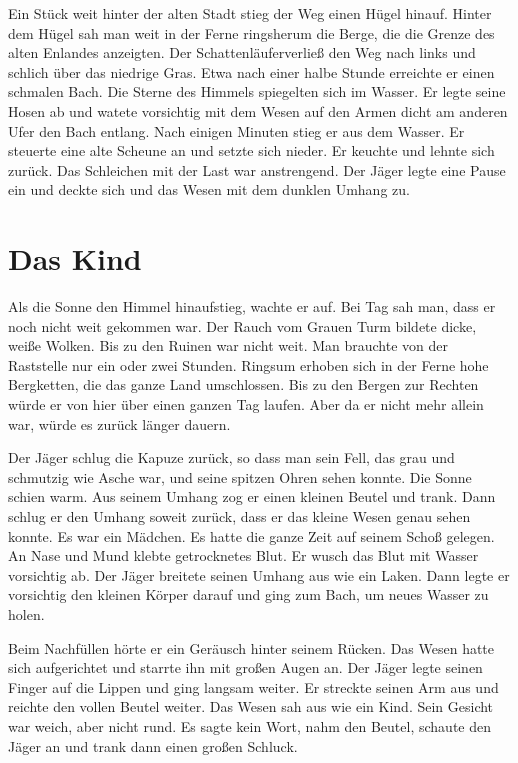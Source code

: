 \documentclass[12pt,a4paper,onecolumn,twoside,ngerman]{book}
\newcommand{\Enland}{Enland}
\newcommand{\Schattenjager}{Schattenläufer}
\begin{document}
Ein Stück weit hinter der alten Stadt stieg der Weg einen Hügel hinauf. Hinter dem Hügel sah man weit in der Ferne ringsherum die Berge, die die Grenze des alten \Enland{es} anzeigten. Der \Schattenjager verließ den Weg nach links und schlich über das niedrige Gras. Etwa nach einer halbe Stunde erreichte er einen schmalen Bach. Die Sterne des Himmels spiegelten sich im Wasser. Er legte seine Hosen ab und watete vorsichtig mit dem Wesen auf den Armen dicht am anderen Ufer den Bach entlang. Nach einigen Minuten stieg er aus dem Wasser. Er steuerte eine alte Scheune an und setzte sich nieder. Er keuchte und lehnte sich zurück. Das Schleichen mit der Last war anstrengend. Der Jäger legte eine Pause ein und deckte sich und das Wesen mit dem dunklen Umhang zu.

\section{Das Kind}
Als die Sonne den Himmel hinaufstieg, wachte er auf. Bei Tag sah man, dass er noch nicht weit gekommen war. Der Rauch vom Grauen Turm bildete dicke, weiße Wolken. Bis zu den Ruinen war nicht weit. Man brauchte von der Raststelle nur ein oder zwei Stunden. Ringsum erhoben sich in der Ferne hohe Bergketten, die das ganze Land umschlossen. Bis zu den Bergen zur Rechten würde er von hier über einen ganzen Tag laufen. Aber da er nicht mehr allein war, würde es zurück länger dauern.

Der Jäger schlug die Kapuze zurück, so dass man sein Fell, das grau und schmutzig wie Asche war, und seine spitzen Ohren sehen konnte. Die Sonne schien warm. Aus seinem Umhang zog er einen kleinen Beutel und trank. Dann schlug er den Umhang soweit zurück, dass er das kleine Wesen genau sehen konnte. Es war ein Mädchen. Es hatte die ganze Zeit auf seinem Schoß gelegen. An Nase und Mund klebte getrocknetes Blut. Er wusch das Blut mit Wasser vorsichtig ab. Der Jäger breitete seinen Umhang aus wie ein Laken. Dann legte er vorsichtig den kleinen Körper darauf und ging zum Bach, um neues Wasser zu holen.

Beim Nachfüllen hörte er ein Geräusch hinter seinem Rücken. Das Wesen hatte sich aufgerichtet und starrte ihn mit großen Augen an. Der Jäger legte seinen Finger auf die Lippen und ging langsam weiter. Er streckte seinen Arm aus und reichte den vollen Beutel weiter. Das Wesen sah aus wie ein Kind. Sein Gesicht war weich, aber nicht rund. Es sagte kein Wort, nahm den Beutel, schaute den Jäger an und trank dann einen großen Schluck. 
\end{document}
